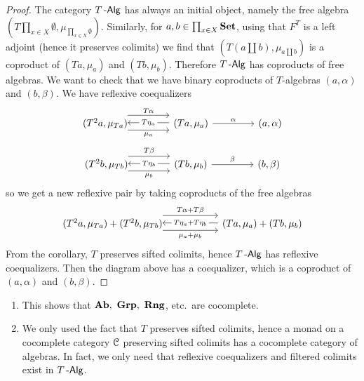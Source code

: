 \documentclass[a4paper,11pt,oneside,openany]{scrbook}
\begin{document}
\begin{proof}
	The category $T\operatorname{-\mathsf{Alg}}$ has always an initial object, namely the free algebra
    $\left(T\prod_{x\in X}\emptyset,\mu_{\prod_{x\in
    X}\emptyset}\right)$. Similarly, for $a,b\in\prod_{x\in X}{\normalfont\textbf{Set}}$, using that
    $F^T$ is a left adjoint (hence it preserves colimits) we find that
	$\left(T\left(a\coprod b\right),\mu_{a\coprod b}\right)$ is a coproduct of
	$(Ta,\mu_a)$ and $(Tb,\mu_b)$. Therefore $T\operatorname{-\mathsf{Alg}}$ has coproducts of free
	algebras. We want to check that we have binary coproducts of $T$-algebras
	$(a,\alpha)$ and $(b,\beta)$. We have reflexive coequalizers
	\[
		\begin{tikzcd}[column sep=1.5cm]
			(T^2a,\mu_{Ta})\hspace{-1.5mm}\arrow[r, shift right=1.5ex, "\mu_a"']  \arrow[r, shift left=2ex, "T\alpha"] & (Ta,\mu_a)\arrow[l, shift right=.25ex, "T\eta_a"description]\arrow[r,"\alpha"]&(a,\alpha)
		\end{tikzcd}
	\]
	\[
		\begin{tikzcd}[column sep=1.5cm]
			(T^2b,\mu_{Tb})\hspace{-1.5mm}\arrow[r, shift right=1.5ex, "\mu_b"']  \arrow[r, shift left=2ex, "T\beta"] & (Tb,\mu_b)\arrow[l, shift right=.25ex, "T\eta_b"description]\arrow[r,"\beta"]&(b,\beta)
		\end{tikzcd}
	\]
	so we get a new reflexive pair by taking coproducts of the free algebras
	\[
		\begin{tikzcd}[column sep=2.0cm]
			(T^2a,\mu_{Ta})+(T^2b,\mu_{Tb})\hspace{-1.5mm}\arrow[r, shift right=1.5ex, "\mu_a+\mu_b"']  \arrow[r, shift left=2ex, "T\alpha+T\beta"] & (Ta,\mu_a)+(Tb,\mu_b)\arrow[l, shift right=.25ex, "T\eta_a+T\eta_b" description]
		\end{tikzcd}
	\]
	From the corollary, $T$ preserves sifted colimits, hence $T\operatorname{-\mathsf{Alg}}$ has reflexive coequalizers. Then the diagram above has a coequalizer, which is a coproduct of $(a,\alpha)$ and $(b,\beta)$.
\end{proof}
\begin{rmk}
	\begin{enumerate}
		\item This shows that $\Ab,\ \mathbf{Grp},\ \mathbf{Rng}$, etc.\ are cocomplete.
		\item We only used the fact that $T$ preserves sifted colimits, hence a
		      monad on a cocomplete category $\operatorname{\mathcal{C}}$ preserving sifted colimits has a
		      cocomplete category of algebras. In fact, we only need that
		      reflexive coequalizers and filtered colimits exist in $T\operatorname{-\mathsf{Alg}}$.
	\end{enumerate}
\end{rmk}
\end{document}
